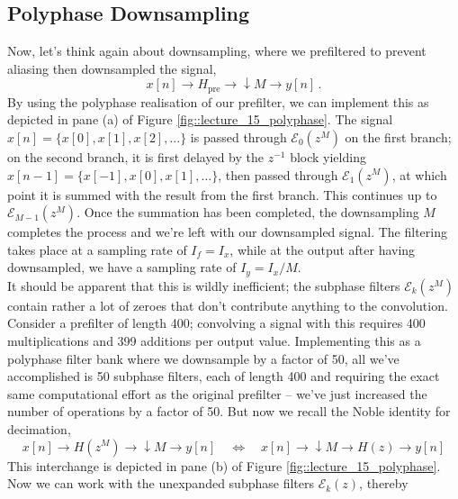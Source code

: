 \subsection{Polyphase Downsampling}
%
Now, let's think again about downsampling, where we prefiltered to prevent aliasing
then downsampled the signal,
%
\begin{displaymath}
  x[n] \longrightarrow \boxed{H_{\mathrm{pre}}}
  \longrightarrow \boxed{\downarrow M}
  \longrightarrow y[n] \,.
\end{displaymath}
%
By using the polyphase realisation of our prefilter, we can implement this as depicted in
pane (a) of Figure \ref{fig::lecture_15_polyphase}.
The signal $x[n] = \{x[0], x[1], x[2], \hdots\}$ is passed through
$\mathscr{E}_0\left(z^M\right)$ on the first branch; on the second branch, it
is first delayed by the $z^{-1}$ block yielding $x[n-1] = \{x[-1], x[0], x[1], \hdots\}$,
then passed through $\mathscr{E}_1\left(z^M\right)$, at which point it is summed with the
result from the first branch. This continues up to
$\mathscr{E}_{M-1}\left(z^M\right)$. Once the summation has been completed, the
downsampling $M$ completes the process and we're left with our downsampled signal. The
filtering takes place at a sampling rate of $I_f = I_x$, while at the output after having
downsampled, we have a sampling rate of $I_y = I_x / M$.\\
%
It should be apparent that this is wildly inefficient; the subphase filters
$\mathscr{E}_k\left(z^M\right)$ contain rather a lot of zeroes that don't contribute
anything to the convolution. Consider a prefilter of length 400; convolving a signal
with this requires 400 multiplications and 399 additions per output value. Implementing
this as a polyphase filter bank where we downsample by a factor of 50, all we've
accomplished is 50 subphase filters, each of length 400 and requiring the exact
same computational effort as the original prefilter -- we've just increased the
number of operations by a factor of 50. But now we recall the Noble identity for
decimation,
%
\begin{displaymath}
  x[n] \longrightarrow \boxed{H\left(z^M\right)}
  \longrightarrow \boxed{\downarrow M}
  \longrightarrow y[n]
  \quad\Leftrightarrow\quad
  x[n] \longrightarrow \boxed{\downarrow M}
  \longrightarrow \boxed{H\left(z\right)}
  \longrightarrow y[n]
\end{displaymath}
%
This interchange is depicted in pane (b) of Figure \ref{fig::lecture_15_polyphase}.
Now we can work with the unexpanded subphase filters $\mathscr{E}_k(z)$, thereby
